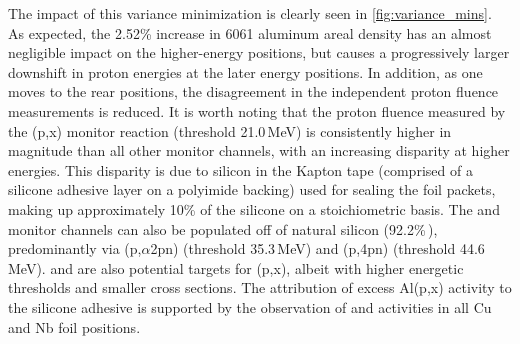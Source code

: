 The impact of this variance minimization is  clearly  seen in   \autoref{fig:variance_mins}.
As expected, the 2.52\% increase in 6061 aluminum areal density has an almost negligible impact on the higher-energy positions, but causes a progressively larger downshift  in proton energies at the later energy positions.
In addition, as one moves to the rear  positions, the disagreement in the independent proton fluence measurements is reduced.
It is worth noting that the proton fluence measured by the (p,x) monitor reaction (threshold 21.0\,MeV) is consistently higher in magnitude than all other monitor channels, with an increasing disparity at higher energies.
This disparity is due to silicon in the Kapton tape (comprised of a silicone adhesive layer on a polyimide backing) used for sealing the foil packets,  making up approximately 10\% of the silicone on a stoichiometric basis.
The  and  monitor channels can also be populated off of natural silicon  (92.2\%\,), predominantly via (p,$\alpha$2pn) (threshold 35.3\,MeV) and (p,4pn) (threshold 44.6\,MeV).
 and  are also potential targets for (p,x), albeit with higher energetic thresholds and smaller cross sections.
The attribution of excess Al(p,x) activity to the silicone adhesive is supported by the observation of  and  activities in all Cu and Nb foil positions.



